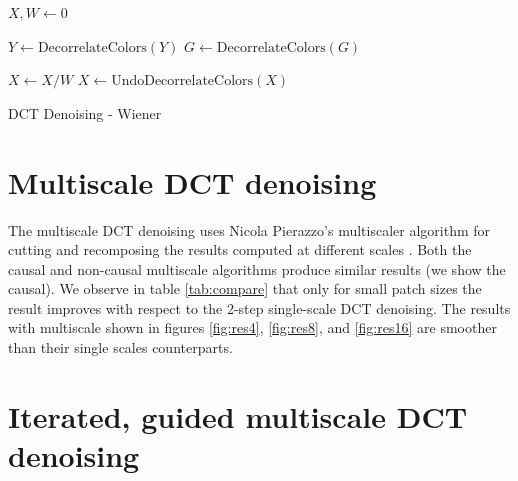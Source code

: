 \documentclass{ipol}
\begin{document}
\begin{algorithm}
\DontPrintSemicolon
{}

$X, W \gets  0$\;

$Y \gets  \text{DecorrelateColors}(Y)$\;
$G \gets  \text{DecorrelateColors}(G)$\;


    $ X \gets  X / W$ \;
	$X \gets  \text{UndoDecorrelateColors}(X)$\;

\caption{DCT Denoising - Wiener}

\label{alg:dct2}


\end{algorithm}

\section{Multiscale DCT denoising}

The multiscale DCT denoising uses Nicola Pierazzo's multiscaler algorithm for cutting and recomposing the results computed at different scales \cite{multiscaler2016}. Both the causal and non-causal multiscale algorithms produce similar results (we show the causal). 
We observe in table \ref{tab:compare} that only for small patch sizes the result improves with respect to the 2-step single-scale DCT denoising. The results with multiscale shown in figures \ref{fig:res4}, \ref{fig:res8}, and \ref{fig:res16} are smoother than their single scales counterparts. 



\section{Iterated, guided multiscale DCT denoising}
\end{document}
